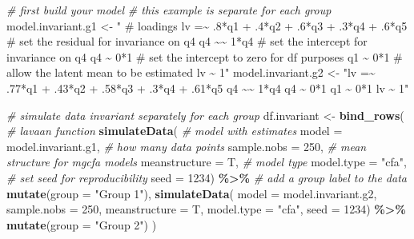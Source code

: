 \documentclass[
  man,floatsintext]{apa7}
\newenvironment{Shaded}{\begin{snugshade}}{\end{snugshade}}
\newcommand{\AttributeTok}[1]{\textcolor[rgb]{0.13,0.29,0.53}{#1}}
\newcommand{\CommentTok}[1]{\textcolor[rgb]{0.56,0.35,0.01}{\textit{#1}}}
\newcommand{\DecValTok}[1]{\textcolor[rgb]{0.00,0.00,0.81}{#1}}
\newcommand{\FunctionTok}[1]{\textcolor[rgb]{0.13,0.29,0.53}{\textbf{#1}}}
\newcommand{\NormalTok}[1]{#1}
\newcommand{\OtherTok}[1]{\textcolor[rgb]{0.56,0.35,0.01}{#1}}
\newcommand{\SpecialCharTok}[1]{\textcolor[rgb]{0.81,0.36,0.00}{\textbf{#1}}}
\newcommand{\StringTok}[1]{\textcolor[rgb]{0.31,0.60,0.02}{#1}}
\begin{document}
\begin{Shaded}
\begin{Highlighting}[]
\CommentTok{\# first build your model}
\CommentTok{\# this example is separate for each group}
\NormalTok{model.invariant.g1 }\OtherTok{\textless{}{-}} \StringTok{"}
\StringTok{\# loadings}
\StringTok{lv =\textasciitilde{} .8*q1 + .4*q2 + .6*q3 + .3*q4 + .6*q5 }
\StringTok{\# set the residual for invariance on q4}
\StringTok{q4 \textasciitilde{}\textasciitilde{} 1*q4}
\StringTok{\# set the intercept for invariance on q4}
\StringTok{q4 \textasciitilde{} 0*1}
\StringTok{\# set the intercept to zero for df purposes}
\StringTok{q1 \textasciitilde{} 0*1}
\StringTok{\# allow the latent mean to be estimated }
\StringTok{lv \textasciitilde{} 1"}
\NormalTok{model.invariant.g2 }\OtherTok{\textless{}{-}} \StringTok{"lv =\textasciitilde{} .77*q1 + .43*q2 + .58*q3 + .3*q4 + .61*q5}
\StringTok{q4 \textasciitilde{}\textasciitilde{} 1*q4}
\StringTok{q4 \textasciitilde{} 0*1}
\StringTok{q1 \textasciitilde{} 0*1}
\StringTok{lv \textasciitilde{} 1"}

\CommentTok{\# simulate data invariant separately for each group}
\NormalTok{df.invariant }\OtherTok{\textless{}{-}} \FunctionTok{bind\_rows}\NormalTok{(}
  \CommentTok{\# lavaan function }
  \FunctionTok{simulateData}\NormalTok{(}
    \CommentTok{\# model with estimates }
    \AttributeTok{model =}\NormalTok{ model.invariant.g1, }
    \CommentTok{\# how many data points}
    \AttributeTok{sample.nobs =} \DecValTok{250}\NormalTok{, }
    \CommentTok{\# mean structure for mgcfa models }
    \AttributeTok{meanstructure =}\NormalTok{ T, }
    \CommentTok{\# model type}
    \AttributeTok{model.type =} \StringTok{"cfa"}\NormalTok{,}
    \CommentTok{\# set seed for reproducibility }
    \AttributeTok{seed =} \DecValTok{1234}\NormalTok{) }\SpecialCharTok{\%\textgreater{}\%} 
    \CommentTok{\# add a group label to the data }
    \FunctionTok{mutate}\NormalTok{(}\AttributeTok{group =} \StringTok{"Group 1"}\NormalTok{), }
  \FunctionTok{simulateData}\NormalTok{(}
    \AttributeTok{model =}\NormalTok{ model.invariant.g2, }
    \AttributeTok{sample.nobs =} \DecValTok{250}\NormalTok{, }
    \AttributeTok{meanstructure =}\NormalTok{ T, }
    \AttributeTok{model.type =} \StringTok{"cfa"}\NormalTok{,}
    \AttributeTok{seed =} \DecValTok{1234}\NormalTok{) }\SpecialCharTok{\%\textgreater{}\%} 
    \FunctionTok{mutate}\NormalTok{(}\AttributeTok{group =} \StringTok{"Group 2"}\NormalTok{) }
\NormalTok{)}
\end{Highlighting}
\end{Shaded}
\end{document}
